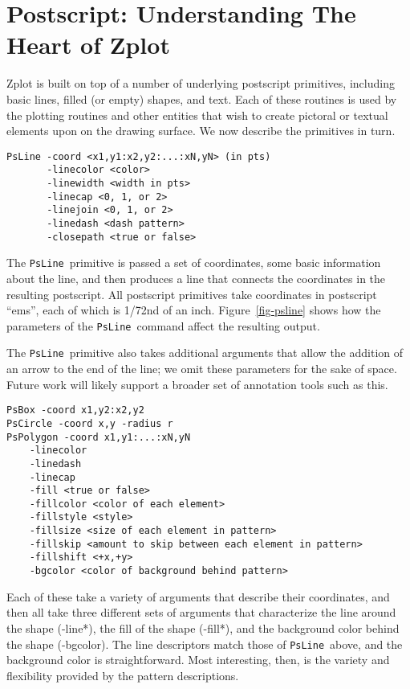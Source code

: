 \section{Postscript: Understanding The Heart of Zplot}
\label{sec-ps}

\newcommand{\psline}{\texttt{PsLine}}
\newcommand{\psbox}{\texttt{PsBox}}
\newcommand{\pstext}{\texttt{PsText}}

Zplot is built on top of a number of underlying postscript primitives,
including basic lines, filled (or empty) shapes, and text. Each of these
routines is used by the plotting routines and other entities that wish to
create pictoral or textual elements upon on the drawing surface. We now
describe the primitives in turn.

\begin{verbatim}
PsLine -coord <x1,y1:x2,y2:...:xN,yN> (in pts)
       -linecolor <color> 
       -linewidth <width in pts>
       -linecap <0, 1, or 2>
       -linejoin <0, 1, or 2>
       -linedash <dash pattern>
       -closepath <true or false>
\end{verbatim}



The \psline\ primitive is passed a set of coordinates, some basic information
about the line, and then produces a line that connects the coordinates in the
resulting postscript. All postscript primitives take coordinates in postscript
``ems'', each of which is 1/72nd of an inch. Figure~\ref{fig-psline} shows how
the parameters of the \psline\ command affect the resulting output.

The \psline\ primitive also takes additional arguments that allow the addition
of an arrow to the end of the line; we omit these parameters for the sake of
space. Future work will likely support a broader set of annotation tools such
as this.



\begin{verbatim}
PsBox -coord x1,y2:x2,y2
PsCircle -coord x,y -radius r
PsPolygon -coord x1,y1:...:xN,yN
    -linecolor 
    -linedash 
    -linecap 
    -fill <true or false>
    -fillcolor <color of each element>
    -fillstyle <style>
    -fillsize <size of each element in pattern>
    -fillskip <amount to skip between each element in pattern>
    -fillshift <+x,+y>
    -bgcolor <color of background behind pattern>
\end{verbatim}

Each of these take a variety of arguments that describe their coordinates,
and then all take three different sets of arguments that characterize the line
around the shape (-line*), the fill of the shape (-fill*), and the background
color behind the shape (-bgcolor). The line descriptors match those of
\psline\ above, and the background color is straightforward. Most interesting,
then, is the variety and flexibility provided by the pattern descriptions.

